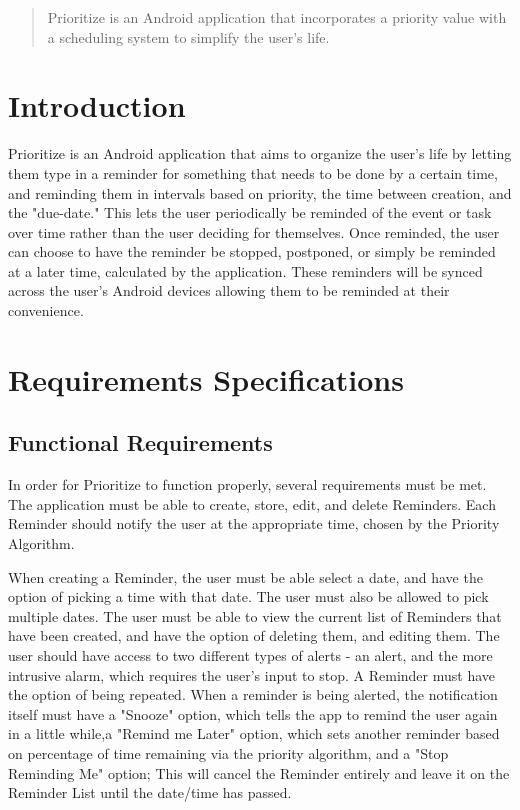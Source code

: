 \documentclass[12pt]{article}
\begin{document}
\maketitle



\newpage
\tableofcontents
\newpage



\begin{abstract}
Prioritize is an Android application that incorporates a priority value with a scheduling system to simplify the user's life.
\end{abstract}

\section{Introduction}
Prioritize is an Android application that aims to organize the user's life by letting them type in a reminder for something that needs to be done by a certain time, and reminding them in intervals based on priority, the time between creation, and the "due-date." This lets the user periodically be reminded of the event or task over time rather than the user deciding for themselves. Once reminded, the user can choose to have the reminder be stopped, postponed, or simply be reminded at a later time, calculated by the application. These reminders will be synced across the user's Android devices allowing them to be reminded at their convenience.



\section{Requirements Specifications}\label{Requirements Specifications}
\subsection{Functional Requirements}

In order for Prioritize to function properly, several requirements must be met. The application must be able to create, store, edit, and delete Reminders. Each Reminder should notify the user at the appropriate time, chosen by the Priority Algorithm. 

When creating a Reminder, the user must be able select a date, and have the option of picking a time with that date. The user must also be allowed to pick multiple dates. The user must be able to view the current list of Reminders that have been created, and have the option of deleting them, and editing them. The user should have access to two different types of alerts - an alert, and the more intrusive alarm, which requires the user's input to stop. A Reminder must have the option of being repeated. When a reminder is being alerted, the notification itself must have a "Snooze" option, which tells the app to remind the user again in a little while,a  "Remind me Later" option, which sets another reminder based on percentage of time remaining via the priority algorithm, and a "Stop Reminding Me" option; This will cancel the Reminder entirely and leave it on the Reminder List until the date/time has passed.
\end{document}
